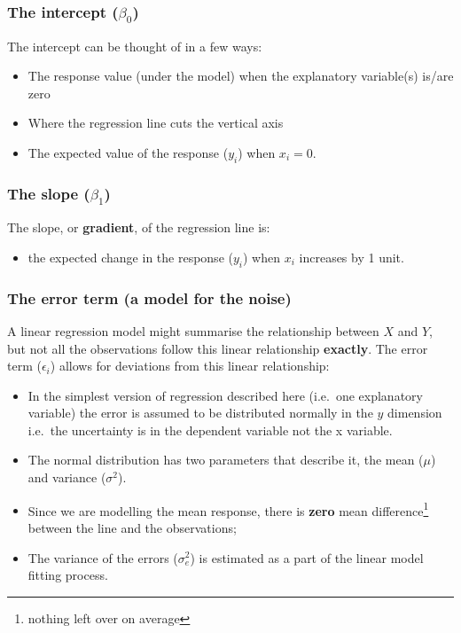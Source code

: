 \documentclass[
  oneside]{krantz}
\providecommand{\tightlist}{%
  \setlength{\itemsep}{0pt}\setlength{\parskip}{0pt}}
\begin{document}
\hypertarget{the-intercept-beta_0}{%
\subsubsection{\texorpdfstring{The intercept (\(\beta_0\))}{The intercept (\textbackslash beta\_0)}}\label{the-intercept-beta_0}}

The intercept can be thought of in a few ways:

\begin{itemize}
\tightlist
\item
  The response value (under the model) when the explanatory variable(s) is/are zero
\item
  Where the regression line cuts the vertical axis
\item
  The expected value of the response (\(y_i\)) when \(x_i=0\).
\end{itemize}

\hypertarget{the-slope-beta_1}{%
\subsubsection{\texorpdfstring{The slope (\(\beta_1\))}{The slope (\textbackslash beta\_1)}}\label{the-slope-beta_1}}

The slope, or \textbf{gradient}, of the regression line is:

\begin{itemize}
\tightlist
\item
  the expected change in the response (\(y_i\)) when \(x_i\) increases by 1 unit.
\end{itemize}

\hypertarget{the-error-term-a-model-for-the-noise}{%
\subsubsection{The error term (a model for the noise)}\label{the-error-term-a-model-for-the-noise}}

A linear regression model might summarise the relationship between \(X\) and \(Y\), but not all the observations follow this linear relationship \textbf{exactly}. The error term (\(\epsilon_i\)) allows for deviations from this linear relationship:

\begin{itemize}
\tightlist
\item
  In the simplest version of regression described here (i.e.~one explanatory variable) the error is assumed to be distributed normally in the \(y\) dimension i.e.~the uncertainty is in the dependent variable not the x variable.
\item
  The normal distribution has two parameters that describe it, the mean (\(\mu\)) and variance (\(\sigma^2\)).
\item
  Since we are modelling the mean response, there is \textbf{zero} mean difference\footnote{nothing left over on average} between the line and the observations;
\item
  The variance of the errors (\(\sigma_e^2\)) is estimated as a part of the linear model fitting process.
\end{itemize}
\end{document}
